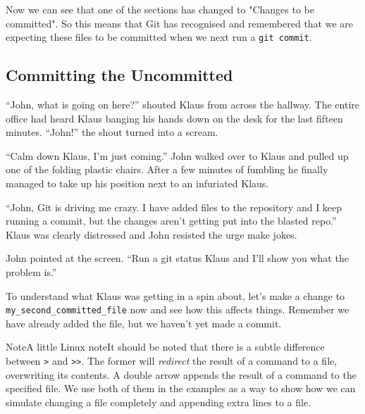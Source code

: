 
Now we can see that one of the sections has changed to "Changes to be committed".
So this means that Git has recognised and remembered that we are expecting these files to be committed when we next run a \texttt{git commit}.

\subsection{Committing the Uncommitted}
\begin{trenches}
``John, what is going on here?'' shouted Klaus from across the hallway.
The entire office had heard Klaus banging his hands down on the desk for the last fifteen minutes.
``John!'' the shout turned into a scream.

``Calm down Klaus, I'm just coming.''
John walked over to Klaus and pulled up one of the folding plastic chairs.
After a few minutes of fumbling he finally managed to take up his position next to an infuriated Klaus.

``John, Git is driving me crazy. I have added files to the repository and I keep running a commit, but the changes aren't getting put into the blasted repo.''
Klaus was clearly distressed and John resisted the urge make jokes.

John pointed at the screen.
``Run a git status Klaus and I'll show you what the problem is.''
\end{trenches}

To understand what Klaus was getting in a spin about, let's make a change to \texttt{my\_second\_committed\_file} now and see how this affects things.
Remember we have already added the file, but we haven't yet made a commit.

\begin{callout}{Note}{A little Linux note}It should be noted that there is a subtle difference between \texttt{>} and \texttt{>>}.
The former will \emph{redirect} the result of a command to a file, overwriting its contents.
A double arrow appends the result of a command to the specified file.
We use both of them in the examples as a way to show how we can simulate changing a file completely and appending extra lines to a file.
\end{callout}

